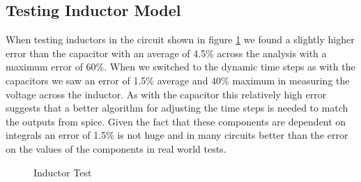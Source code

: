 \documentclass{article}
\begin{document}
\subsection{Testing Inductor Model}
When testing inductors in the circuit shown in figure \ref{fig:InducTest} we found a slightly higher error than the capacitor with an average of 4.5\% across the analysis with a maximum error of 60\%. When we switched to the dynamic time steps as with the capacitors we saw an error of 1.5\% average and 40\% maximum in measuring the voltage across the inductor. As with the capacitor this relatively high error suggests that a better algorithm for adjusting the time steps is needed to match the outputs from spice. Given the fact that these components are dependent on integrals an error of 1.5\% is not huge and in many circuits better than the error on the values of the components in real world tests.
\begin{figure}[h]%
    \centering
    \qquad
    \caption{Inductor Test}%
    \label{fig:InducTest}%
\end{figure}
\newpage
\end{document}
